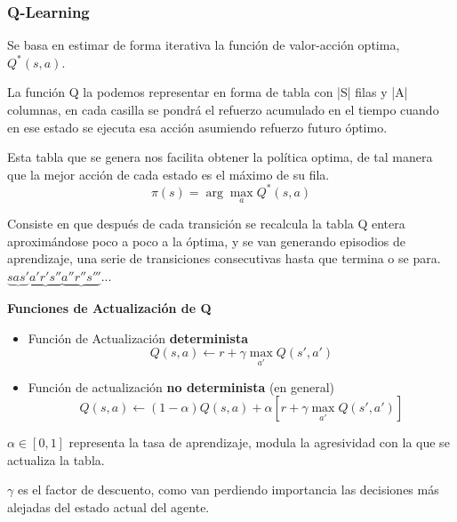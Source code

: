 \documentclass[12pt]{report} %
\begin{document}
\subsubsection{Q-Learning}
Se basa en estimar de forma iterativa la función de valor-acción optima, $Q^*(s,a)$. 

La función Q la podemos representar en forma de tabla con |S| filas y |A| columnas, en cada casilla se pondrá el refuerzo acumulado en el tiempo cuando en ese estado se ejecuta esa acción asumiendo refuerzo futuro óptimo.

Esta tabla que se genera nos facilita obtener la política optima, de tal manera que la mejor acción de cada estado es el máximo de su fila.
$$\pi(s) = \arg \max _a Q^* (s,a)$$

Consiste en que después de cada transición se recalcula la tabla Q entera aproximándose poco a poco a la óptima, y se van generando episodios de aprendizaje, una serie de transiciones consecutivas hasta que termina o se para. $\underbrace{sas'} \underbrace{a'r's''} \underbrace{a''r''s'''}...$

\textbf{Funciones de Actualización de Q}
\begin{itemize}
  \item Función de Actualización \textbf{determinista} 
  $$Q(s,a) \leftarrow r + \gamma \max_{a'} Q(s',a')$$
  \item Función de actualización \textbf{no determinista} (en general)
  $$Q(s,a) \leftarrow (1-\alpha) Q(s,a) + \alpha[r + \gamma \max_{a'} Q(s',a')]$$
\end{itemize}

$\alpha \in [0,1]$ representa la tasa de aprendizaje, modula la agresividad con la que se actualiza la tabla.

$\gamma$ es el factor de descuento, como van perdiendo importancia las decisiones más alejadas del estado actual del agente.
\end{document}
